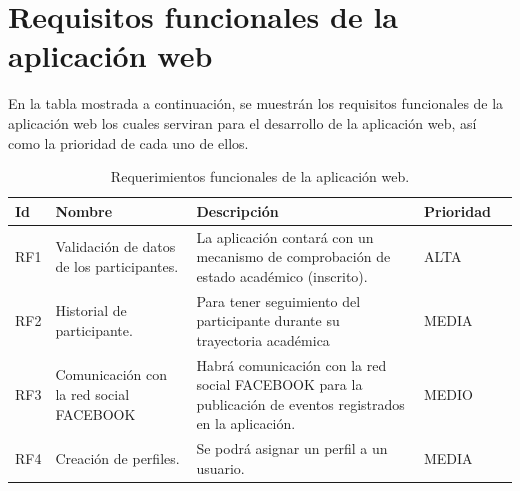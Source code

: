 	\section{Requisitos funcionales de la aplicación web}
	En la tabla mostrada a continuación, se muestrán los requisitos funcionales de la aplicación web los cuales serviran para el desarrollo de la aplicación web, así como la prioridad de cada uno de ellos.
	\begin{table}[htbp]
		\begin{center}
			\begin{tabular}{|l|p{45mm}|p{45mm}|p{45mm}|l}
				\hline
				Id & Nombre & Descripción & Prioridad \\
				\hline 
				RF1 & Validación de datos de los participantes. & La aplicación contará con un mecanismo de comprobación de estado académico (inscrito). & ALTA \\ \hline
				RF2 & Historial de participante. & Para tener seguimiento del participante durante su trayectoria académica & MEDIA  \\ \hline
				RF3 & Comunicación con la red social FACEBOOK &Habrá comunicación con la red social FACEBOOK para la publicación de eventos registrados en la aplicación.  & MEDIO \\ \hline
				RF4 & Creación de perfiles. & Se podrá asignar un perfil a un usuario.& MEDIA \\ \hline
			\end{tabular}
			\pagebreak
			\caption{Requerimientos funcionales de la aplicación web.}
			\label{tabla:sencilla}
		\end{center}
	\end{table}
	
	

